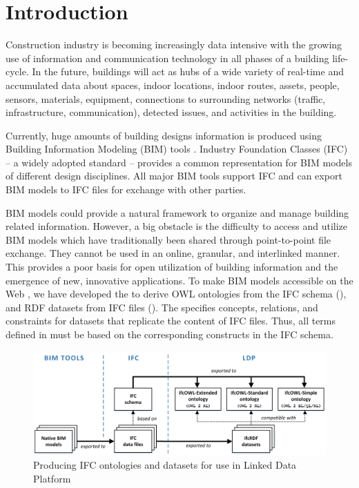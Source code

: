 \section{Introduction}
\label{sec:introduction}

Construction industry is becoming increasingly data intensive with the growing use of
information and communication technology in all phases of a building life-cycle. 
In the future, buildings will act as hubs of a wide variety of real-time and accumulated data about
spaces, indoor locations, indoor routes, assets, people, sensors, materials, equipment, connections
to surrounding networks (traffic, infrastructure, communication), detected issues, and 
activities in the building.

Currently, huge amounts of building designs information is produced
using Building Information Modeling (BIM) tools \cite{eastman2011bim}. Industry Foundation Classes 
(IFC) \cite{ISO16739,liebich2010unveiling} -- a widely adopted standard -- provides a common representation for BIM models of 
different design disciplines. All major BIM tools support IFC and can export BIM models to IFC files for exchange with other parties.

BIM models could provide a natural framework to organize and manage building related information. However, a big obstacle is the difficulty to access and utilize BIM models which have traditionally been shared through point-to-point file exchange. They cannot be used in an online, granular, and 
interlinked manner. This provides a poor basis for open utilization of building information and the 
emergence of new, innovative applications.
To make BIM models accessible on the Web \cite{torma2014wobd}, we have developed the 
 to 
derive OWL ontologies from the IFC schema (\ifcowl{}), and RDF datasets from IFC files 
(\ifcrdf{}). The \ifcowl{} specifies concepts, relations, and constraints for \ifcrdf{} datasets that replicate the content of IFC files. 
Thus, all terms defined in \ifcowl{}  must be based on the corresponding constructs in 
the IFC schema. 

\begin{figure}[h]
\centering
\includegraphics{images/ifcOWL-multilayers-6.png}
\caption{Producing IFC ontologies and datasets for use in Linked Data Platform}
\label{fig:ifcOWL-layers}
\end{figure}

